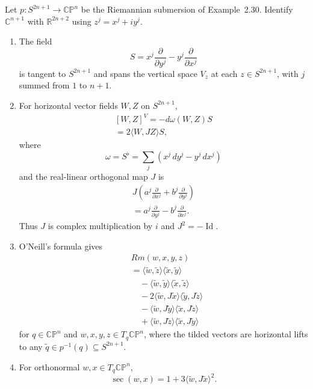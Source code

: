 \begin{proposition}
\label{prop:complex-projective-space-curvature}

Let $p:S^{2n+1}\to\mathbb{CP}^n$ be the Riemannian submersion of
Example~2.30. Identify $\mathbb C^{n+1}$ with $\mathbb R^{2n+2}$ using
$z^j=x^j+iy^j$.
\begin{enumerate}
\item[(a)] The field
\[
S=x^j\frac{\partial}{\partial y^j}
-y^j\frac{\partial}{\partial x^j}
\]
is tangent to $S^{2n+1}$ and spans the vertical space $V_z$ at each
$z\in S^{2n+1}$, with $j$ summed from $1$ to $n+1$.
\item[(b)] For horizontal vector fields $W,Z$ on $S^{2n+1}$,
\[
\begin{gathered}
[W,Z]^V=-d\omega(W,Z)S\\
=2\langle W,JZ\rangle S,
\end{gathered}
\]
where
\[
\omega=S^\flat=\sum_j(x^j\,dy^j-y^j\,dx^j)
\]
and the real-linear orthogonal map $J$ is
\[
\begin{gathered}
J\left(a^j\frac{\partial}{\partial x^j}
+b^j\frac{\partial}{\partial y^j}\right)\\
=a^j\frac{\partial}{\partial y^j}
-b^j\frac{\partial}{\partial x^j}.
\end{gathered}
\]
Thus $J$ is complex multiplication by $i$ and $J^2=-\operatorname{Id}$.
\item[(c)] O'Neill's formula gives
\begin{align*}
&Rm(w,x,y,z)\\
&=\langle\widetilde w,\widetilde z\rangle
  \langle\widetilde x,\widetilde y\rangle
\\
&\quad-\langle\widetilde w,\widetilde y\rangle
  \langle\widetilde x,\widetilde z\rangle\\
&\quad-2\langle\widetilde w,J\widetilde x\rangle
  \langle\widetilde y,J\widetilde z\rangle
\\
&\quad-\langle\widetilde w,J\widetilde y\rangle
  \langle\widetilde x,J\widetilde z\rangle\\
&\quad+\langle\widetilde w,J\widetilde z\rangle
  \langle\widetilde x,J\widetilde y\rangle
\end{align*}
for $q\in\mathbb{CP}^n$ and $w,x,y,z\in T_q\mathbb{CP}^n$, where the tilded
vectors are horizontal lifts to any
$\widetilde q\in p^{-1}(q)\subseteq S^{2n+1}$.
\item[(d)] For orthonormal $w,x\in T_q\mathbb{CP}^n$,
\[
\sec(w,x)=1+3\langle\widetilde w,J\widetilde x\rangle^2.
\]
\end{enumerate}
\end{proposition}

